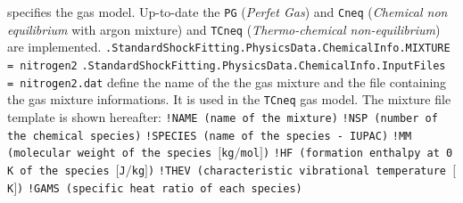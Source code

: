 \documentclass[11pt,a4paper,oneside]{article}
\begin{document}
\newline
\newline
specifies the gas model. Up-to-date the \texttt{PG} (\textit{Perfet Gas}) and \texttt{Cneq} (\textit{Chemical non equilibrium} with argon mixture) and \texttt{TCneq} (\textit{Thermo-chemical non-equilibrium}) are implemented.
\newline
\newline
\hspace*{1cm} \texttt{.StandardShockFitting.PhysicsData.ChemicalInfo.MIXTURE = nitrogen2}
\newline
\hspace*{1cm} \texttt{.StandardShockFitting.PhysicsData.ChemicalInfo.InputFiles = nitrogen2.dat}
\newline
\newline
define the name of the the gas mixture and the file containing the gas mixture informations. It is used in the \texttt{TCneq} gas model.
\newline
The mixture file template is shown hereafter:
\newline
\newline
\hspace*{1.2cm}
\texttt{!NAME \hspace*{2cm} (name of the mixture)}
\newline
\hspace*{1.2cm}
\texttt{!NSP \hspace*{2.2cm} (number of the chemical species)}
\newline
\hspace*{1.2cm}
\texttt{!SPECIES \hspace*{1.4cm} (name of the species - IUPAC)}
\newline
\hspace*{1.2cm}
\texttt{!MM \hspace*{2.4cm} (molecular weight of the species $[$kg$/$mol$]$)}
\newline
\hspace*{1.2cm}
\texttt{!HF \hspace*{2.4cm} (formation enthalpy at 0 K of the species $[$J$/$kg$]$)}
\newline
\hspace*{1.2cm}
\texttt{!THEV \hspace*{2cm} (characteristic vibrational temperature $[$K$]$)}
\newline
\hspace*{1.2cm}
\texttt{!GAMS \hspace*{2cm} (specific heat ratio of each species)}
\end{document}
